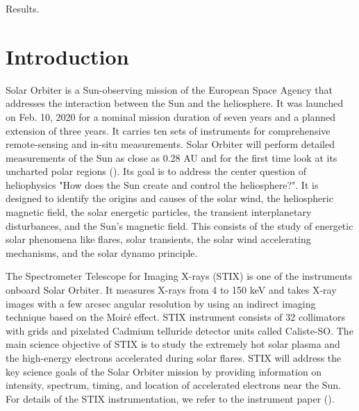 \documentclass{aa}
\begin{document}
   {Results.}
   {}


   \maketitle
%

\section{Introduction}
Solar Orbiter is a Sun-observing mission of the European Space  Agency that 
addresses the interaction between the Sun and the heliosphere.
It was launched on Feb. 10, 2020 for a nominal mission duration of seven years and a planned 
extension of
three years. It carries ten sets of instruments for comprehensive
remote-sensing and in-situ measurements. 
Solar Orbiter  will perform detailed measurements of the Sun as close as 0.28 AU and for the first time look at its uncharted polar regions (\cite{SolarOrbiter2020}).  
Its goal is to  address the center question of heliophysics  "How does the Sun create and control the heliosphere?".  It is designed to identify the origins and causes of the solar wind, the heliospheric magnetic field, the solar energetic particles, the transient interplanetary disturbances, and the Sun's magnetic field.
This consists of the study of energetic solar phenomena like flares,  solar transients,  the solar wind accelerating mechanisms, and the solar dynamo principle.  


The Spectrometer Telescope for Imaging X-rays (STIX) is one of the instruments onboard Solar Orbiter.  
It measures X-rays from 4 to 150 keV and takes X-ray images with a few arcsec angular resolution by using an indirect imaging technique based on the Moiré effect. 
STIX instrument consists of 32 collimators with
grids and pixelated Cadmium telluride detector units called Caliste-SO.
The main science objective of STIX is to study the extremely hot solar plasma and the high-energy electrons accelerated during solar flares. STIX will address the key science goals of the Solar Orbiter mission by providing information on intensity, 
spectrum, timing, and location of accelerated electrons near the Sun.
For details of the STIX instrumentation, we refer to the instrument paper (\cite{StixInstrument}).
\end{document}

